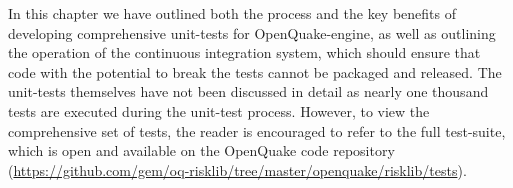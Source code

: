 In this chapter we have outlined both the process and the key benefits of developing comprehensive unit-tests for OpenQuake-engine, as well as outlining the operation of the continuous integration system, which should ensure that code with the potential to break the tests cannot be packaged and released. The unit-tests themselves have not been discussed in detail as nearly one thousand tests are executed during the unit-test process. However, to view the comprehensive set of tests, the reader is encouraged to refer to the full test-suite, which is open and available on the OpenQuake code repository (\href{https://github.com/gem/oq-risklib/tree/master/openquake/risklib/tests}
{https://github.com/gem/oq-risklib/tree/master/openquake/risklib/tests}).